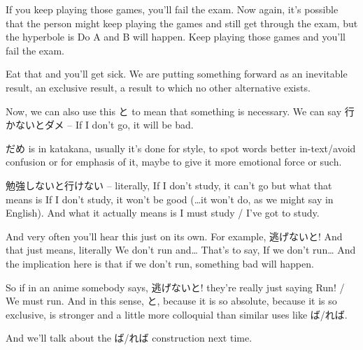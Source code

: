 If you keep playing those games, you'll fail the exam. Now again, it's possible that the person might keep playing the games and still get through the exam, but the hyperbole is Do A and B will happen. Keep playing those games and you'll fail the exam.

Eat that and you'll get sick. We are putting something forward as an inevitable result, an exclusive result, a result to which no other alternative exists.

Now, we can also use this と to mean that something is necessary. We can say 行かないとダメ -- If I don't go, it will be bad.

だめ is in katakana, usually it's done for style, to spot words better in-text/avoid confusion or for emphasis of it, maybe to give it more emotional force or such.

勉強しないと行けない -- literally, If I don't study, it can't go but what that means is If I don't study, it won't be good (\ldots{}it won't do, as we might say in English). And what it actually means is I must study / I've got to study.

And very often you'll hear this just on its own. For example, 逃げないと! And that just means, literally We don't run and\ldots{} That's to say, If we don't run\ldots{} And the implication here is that if we don't run, something bad will happen.

So if in an anime somebody says, 逃げないと! they're really just saying Run! / We must run. And in this sense, と, because it is so absolute, because it is so exclusive, is stronger and a little more colloquial than similar uses like ば/れば.

And we'll talk about the ば/れば construction next time.

\stopsectionlevel
